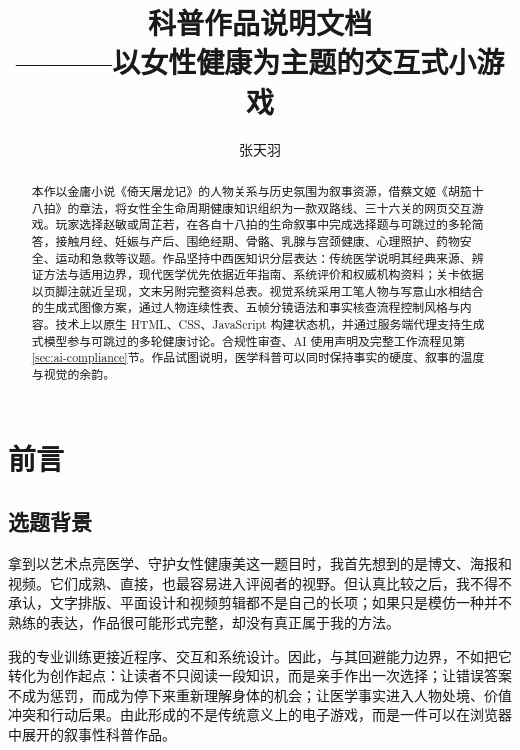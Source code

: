 \documentclass[lang=cn,a4paper,11pt,citestyle=gb7714-2015,bibstyle=gb7714-2015]{elegantpaper}
\title{科普作品说明文档\\———以女性健康为主题的交互式小游戏}
\author{张天羽\\[0.35em]\collegewordmark}
\institute{《中西医学与美学》课程期末大作业说明文档}
\date{\zhdate{2026/6/20}}
\begin{document}
\maketitle
\pagestyle{paperstyle}

\begin{abstract}
本作以金庸小说《倚天屠龙记》的人物关系与历史氛围为叙事资源，借蔡文姬《胡笳十八拍》的章法，将女性全生命周期健康知识组织为一款双路线、三十六关的网页交互游戏。玩家选择赵敏或周芷若，在各自十八拍的生命叙事中完成选择题与可跳过的多轮简答，接触月经、妊娠与产后、围绝经期、骨骼、乳腺与宫颈健康、心理照护、药物安全、运动和急救等议题。作品坚持中西医知识分层表达：传统医学说明其经典来源、辨证方法与适用边界，现代医学优先依据近年指南、系统评价和权威机构资料；关卡依据以页脚注就近呈现，文末另附完整资料总表。视觉系统采用工笔人物与写意山水相结合的生成式图像方案，通过人物连续性表、五帧分镜语法和事实核查流程控制风格与内容。技术上以原生 HTML、CSS、JavaScript 构建状态机，并通过服务端代理支持生成式模型参与可跳过的多轮健康讨论。合规性审查、AI 使用声明及完整工作流程见第\ref{sec:ai-compliance}节。作品试图说明，医学科普可以同时保持事实的硬度、叙事的温度与视觉的余韵。

\end{abstract}

\clearpage


\clearpage
\tableofcontents

\clearpage
\section{前言}

\subsection{选题背景}

拿到以艺术点亮医学、守护女性健康美这一题目时，我首先想到的是博文、海报和视频。它们成熟、直接，也最容易进入评阅者的视野。但认真比较之后，我不得不承认，文字排版、平面设计和视频剪辑都不是自己的长项；如果只是模仿一种并不熟练的表达，作品很可能形式完整，却没有真正属于我的方法。

我的专业训练更接近程序、交互和系统设计。因此，与其回避能力边界，不如把它转化为创作起点：让读者不只阅读一段知识，而是亲手作出一次选择；让错误答案不成为惩罚，而成为停下来重新理解身体的机会；让医学事实进入人物处境、价值冲突和行动后果。由此形成的不是传统意义上的电子游戏，而是一件可以在浏览器中展开的叙事性科普作品。
\end{document}
